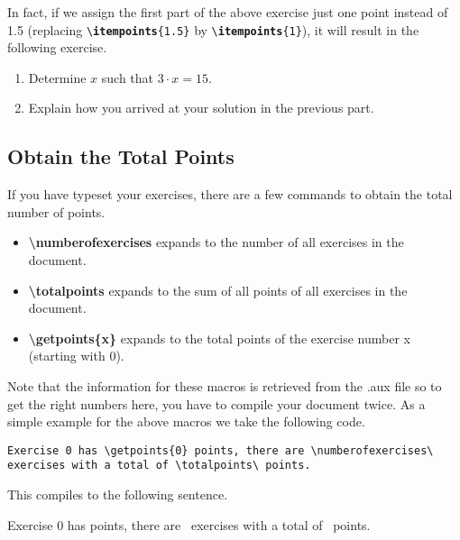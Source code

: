 \documentclass[
  twocolumn,%
  fontsize=9pt,%
  DIV=calc,%
  numbers=noendperiod%
]{scrartcl}
\newcommand{\emphstyle}{\ttfamily\color{NavyBlue}\bfseries}%
\newcommand{\keyword}[1]{{\emphstyle#1}}%
\begin{document}
\noindent In fact, if we assign the first part of the above exercise just one point instead of 1.5 (replacing \texttt{\textbackslash\keyword{itempoints}\{1.5\}} by \texttt{\textbackslash \keyword{itempoints}\{1\}}), it will result in the following exercise.
\begin{exercise}\vspace{-1.5em}
  \begin{enumerate}
    \item Determine $x$ such that $3 \cdot x = 15$.
    \item Explain how you arrived at your solution in the previous part.
  \end{enumerate}
\end{exercise}

\subsection{Obtain the Total Points}
If you have typeset your exercises, there are a few commands to obtain the total number of points.

\begin{itemize}
  \item \textcolor{NavyBlue}{\ttfamily\bfseries\textbackslash numberofexercises} expands to the number of all exercises in the document.
  \item \textcolor{NavyBlue}{\ttfamily\bfseries\textbackslash totalpoints} expands to the sum of all points of all exercises in the document. 
  \item \textcolor{NavyBlue}{\ttfamily\bfseries\textbackslash getpoints\{x\}} expands to the total points of the exercise number x (starting with $0$). 
\end{itemize}
Note that the information for these macros is retrieved from the .aux file so to get the right numbers here, you have to compile your document twice. As a simple example for the above macros we take the following code.


\begin{lstlisting}[emph={numberofexercises,totalpoints,getpoints}]
Exercise 0 has \getpoints{0} points, there are \numberofexercises\ exercises with a total of \totalpoints\ points.
\end{lstlisting}

\noindent This compiles to the following sentence.\smallskip

Exercise 0 has  points, there are \numberofexercises\ exercises with a total of \totalpoints\ points.
\end{document}
